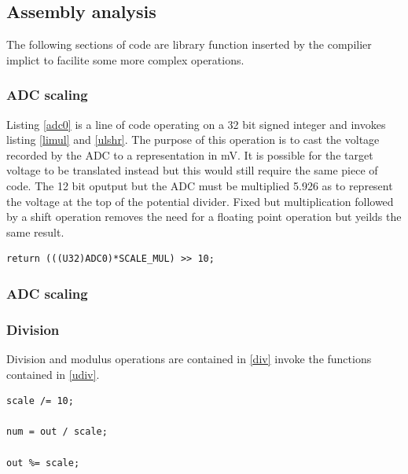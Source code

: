 \documentclass[12pt]{article}%
\begin{document}
\subsection{Assembly analysis}

The following sections of code are library function inserted by the compilier implict to facilite some more complex operations.

\subsubsection{ADC scaling}

Listing \ref{adc0} is a line of code operating on a 32 bit signed integer and invokes listing \ref{limul} and \ref{ulshr}. The purpose of this operation is to cast the voltage recorded by the ADC to a representation in mV. It is possible for the target voltage to be translated instead but this would still require the same piece of code. The 12 bit oputput but the ADC must be multiplied 5.926 as to represent the voltage at the top of the potential divider. Fixed but multiplication followed by a shift operation removes the need for a floating point operation but yeilds the same result.

\begin{lstlisting}
return (((U32)ADC0)*SCALE_MUL) >> 10;
\end{lstlisting}




\subsubsection{ADC scaling}






\subsubsection{Division}

Division and modulus operations are contained in \ref{div} invoke the functions contained in \ref{udiv}.

\begin{lstlisting}
scale /= 10;

num = out / scale;

out %= scale;	
\end{lstlisting}
\end{document}
